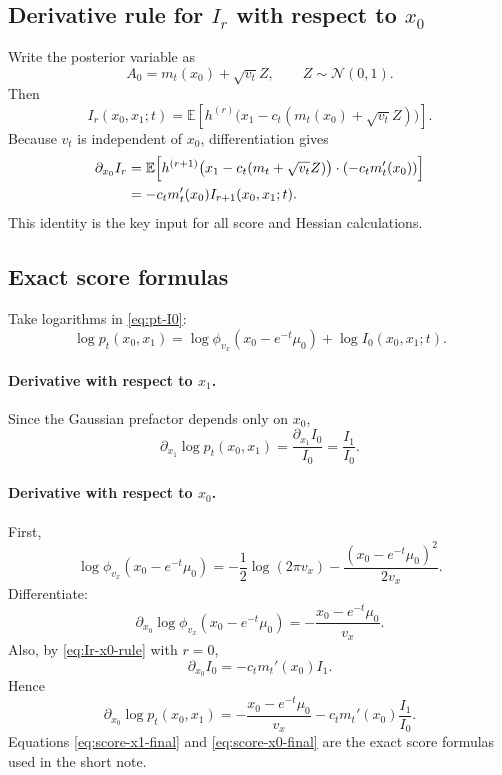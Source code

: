 \documentclass[11pt,a4paper]{article}
\newcommand{\E}{\mathbb{E}}
\newcommand{\pt}{p_t}
\begin{document}
\subsection[Derivative rule for Ir with respect to x0]{Derivative rule for $I_r$ with respect to $x_0$}

Write the posterior variable as
\[
A_0 = m_t(x_0) + \sqrt{v_t} Z,
\qquad Z \sim \mathcal N(0,1).
\]
Then
\[
I_r(x_0,x_1;t)
=
\E\!\left[h^{(r)}\bigl(x_1-c_t(m_t(x_0)+\sqrt{v_t}Z)\bigr)\right].
\]
Because $v_t$ is independent of $x_0$, differentiation gives
\begin{align}
\partial_{x_0} I_r
&=
\E\!\left[
 h^{(r+1)}\bigl(x_1-c_t(m_t+\sqrt{v_t}Z)\bigr)
 \cdot
 (-c_t m_t'(x_0))
\right]
\notag\\
&=
-c_t m_t'(x_0) I_{r+1}(x_0,x_1;t).
\label{eq:Ir-x0-rule}
\end{align}
This identity is the key input for all score and Hessian calculations.

\subsection{Exact score formulas}

Take logarithms in \eqref{eq:pt-I0}:
\begin{equation}
\log \pt(x_0,x_1)
=
\log \phi_{v_x}(x_0-e^{-t}\mu_0)
+
\log I_0(x_0,x_1;t).
\label{eq:logp-split}
\end{equation}

\paragraph{Derivative with respect to $x_1$.}
Since the Gaussian prefactor depends only on $x_0$,
\begin{equation}
\partial_{x_1} \log \pt(x_0,x_1)
=
\frac{\partial_{x_1} I_0}{I_0}
=
\frac{I_1}{I_0}.
\label{eq:score-x1-final}
\end{equation}

\paragraph{Derivative with respect to $x_0$.}
First,
\[
\log \phi_{v_x}(x_0-e^{-t}\mu_0)
=
-\frac12 \log(2\pi v_x) - \frac{(x_0-e^{-t}\mu_0)^2}{2v_x}.
\]
Differentiate:
\begin{equation}
\partial_{x_0} \log \phi_{v_x}(x_0-e^{-t}\mu_0)
=
-\frac{x_0-e^{-t}\mu_0}{v_x}.
\label{eq:gaussian-prefactor-deriv}
\end{equation}
Also, by \eqref{eq:Ir-x0-rule} with $r=0$,
\[
\partial_{x_0} I_0 = -c_t m_t'(x_0) I_1.
\]
Hence
\begin{equation}
\partial_{x_0} \log \pt(x_0,x_1)
=
-\frac{x_0-e^{-t}\mu_0}{v_x}
-c_t m_t'(x_0) \frac{I_1}{I_0}.
\label{eq:score-x0-final}
\end{equation}
Equations \eqref{eq:score-x1-final} and \eqref{eq:score-x0-final} are the exact score formulas used in the short note.
\end{document}
